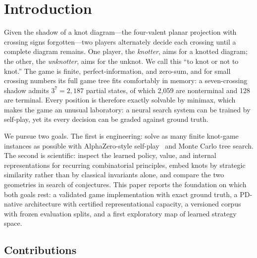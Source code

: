 \section{Introduction}
\label{sec:introduction}

Given the shadow of a knot diagram---the four-valent planar projection with
crossing signs forgotten---two players alternately decide each crossing until
a complete diagram remains. One player, the \emph{knotter}, aims for a knotted
diagram; the other, the \emph{unknotter}, aims for the unknot. We call this
``to knot or not to knot.'' The game is finite, perfect-information, and
zero-sum, and for small crossing numbers its full game tree fits comfortably in
memory: a seven-crossing shadow admits $3^7 = 2{,}187$ partial states, of which
2,059 are nonterminal and 128 are terminal. Every position is therefore exactly
solvable by minimax, which makes the game an unusual laboratory: a neural
search system can be trained by self-play, yet its every decision can be graded
against ground truth.

We pursue two goals. The first is engineering: solve as many finite knot-game
instances as possible with AlphaZero-style self-play~\cite{silver2017mastering}
and Monte Carlo tree search. The second is scientific: inspect the learned
policy, value, and internal representations for recurring combinatorial
principles, embed knots by strategic similarity rather than by classical
invariants alone, and compare the two geometries in search of conjectures. This
paper reports the foundation on which both goals rest: a validated game
implementation with exact ground truth, a PD-native architecture with certified
representational capacity, a versioned corpus with frozen evaluation splits,
and a first exploratory map of learned strategy space.

\subsection{Contributions}
\label{sec:contributions}


